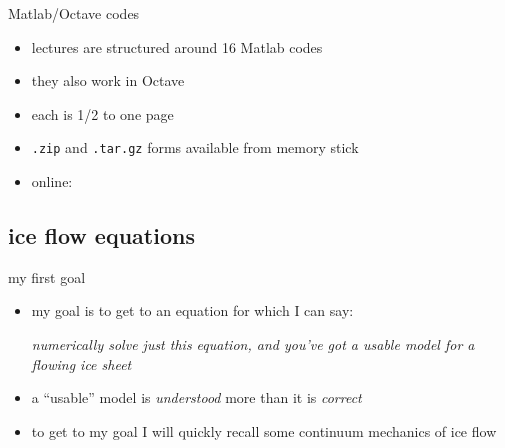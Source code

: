 \begin{frame}{Matlab/Octave codes}

\begin{itemize}
\item lectures are structured around 16 Matlab codes
\item they also work in Octave
\item each is 1/2 to one page
\item \texttt{.zip} and \texttt{.tar.gz} forms available from memory stick
\item online:

\bigskip\bigskip\small
\centerline{}
\end{itemize}
\end{frame}


\subsection{ice flow equations}

\begin{frame}{my first goal}

\begin{itemize}
\item my goal is to get to an equation for which I can say:
\bigskip

\begin{center}
\emph{numerically solve just this equation, and you've got a usable model for a flowing ice sheet}
\end{center}
\bigskip

\item a ``usable'' model is \emph{understood} more than it is \emph{correct}
\item to get to my goal I will quickly recall some continuum mechanics of ice flow
\end{itemize}
\end{frame}


